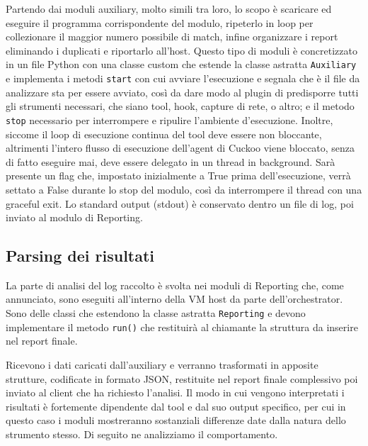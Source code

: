 Partendo dai moduli auxiliary, molto simili tra loro, lo scopo è scaricare ed eseguire il programma corrispondente del modulo, ripeterlo in loop per collezionare il maggior numero possibile di match, infine organizzare i report eliminando i duplicati e riportarlo all'host.
Questo tipo di moduli è concretizzato in un file Python con una classe custom che estende la classe astratta \texttt{Auxiliary} e implementa i metodi \texttt{start} con cui avviare l'esecuzione e segnala che è il file da analizzare sta per essere avviato, così da dare modo al plugin di predisporre tutti gli strumenti necessari, che siano tool, hook, capture di rete, o altro; e il metodo \texttt{stop} necessario per interrompere e ripulire l'ambiente d'esecuzione.
Inoltre, siccome il loop di esecuzione continua del tool deve essere non bloccante, altrimenti l'intero flusso di esecuzione dell'agent di Cuckoo viene bloccato, senza di fatto eseguire mai, deve essere delegato in un thread in background.
Sarà presente un flag che, impostato inizialmente a True prima dell'esecuzione, verrà settato a False durante lo stop del modulo, così da interrompere il thread con una graceful exit.
Lo standard output (stdout) è conservato dentro un file di log, poi inviato al modulo di Reporting.

\subsection{Parsing dei risultati}
La parte di analisi del log raccolto è svolta nei moduli di Reporting che, come annunciato, sono eseguiti all'interno della VM host da parte dell'orchestrator.
Sono delle classi che estendono la classe astratta \texttt{Reporting} e devono implementare il metodo \texttt{run()} che restituirà al chiamante la struttura da inserire nel report finale.

Ricevono i dati caricati dall'auxiliary e verranno trasformati in apposite strutture, codificate in formato JSON, restituite nel report finale complessivo poi inviato al client che ha richiesto l'analisi.
Il modo in cui vengono interpretati i risultati è fortemente dipendente dal tool e dal suo output specifico, per cui in questo caso i moduli mostreranno sostanziali differenze date dalla natura dello strumento stesso.
Di seguito ne analizziamo il comportamento.

